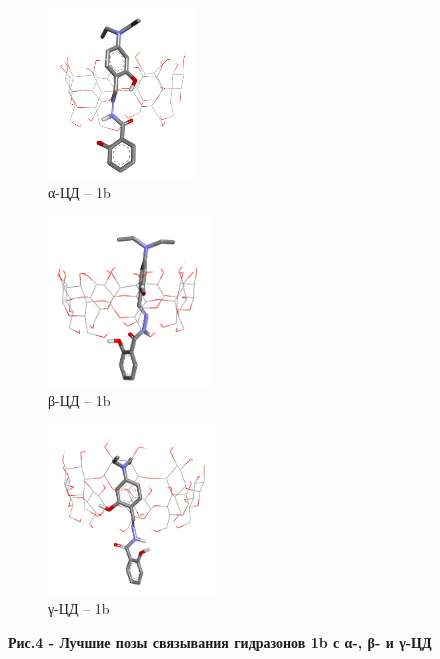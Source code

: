 \begin{figure}[H]
    \centering
    \begin{subfigure}[t]{0.3\textwidth}
        \centering
        \includegraphics[width=\textwidth, height=4.5cm]{media/chem2/image55}
        \caption*{α-ЦД -- 1b}
    \end{subfigure}
    \begin{subfigure}[t]{0.3\textwidth}
        \centering
        \includegraphics[width=\textwidth, height=4.5cm]{media/chem2/image56}
        \caption*{β-ЦД -- 1b}
    \end{subfigure}
    \begin{subfigure}[t]{0.3\textwidth}
        \centering
        \includegraphics[width=\textwidth, height=4.5cm]{media/chem2/image57}
        \caption*{γ-ЦД -- 1b}
    \end{subfigure}
    \caption*{{\bfseries Рис.4 - Лучшие позы связывания гидразонов 1b с α-, β- и γ-ЦД}}
\end{figure}

